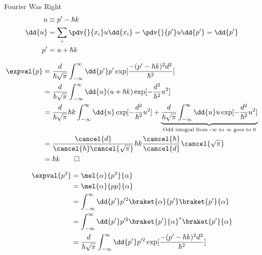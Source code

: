 \begin{answer}
\begin{answerpart}{Fourier Was Right}
    \begin{equation}
      \begin{split}
        u &\equiv p' - \hbar k\\
        \dd{u} &= \sum_i \pdv{}{x_i}u \dd{x_i} = \pdv{}{p'}u \dd{p'} = \dd{p'}\\
        p' &= u + \hbar k\\
      \end{split}
    \end{equation}

    \begin{equation}
      \begin{split}
        \expval{p}
        &=
        \frac{d}{\hbar\sqrt{\pi}}
        \int_{-\infty}^{\infty} \dd{p'} p'
        \exp[\frac{-(p' - \hbar k)^2d^2}{\hbar^2}]
        \\
        &=
        \frac{d}{\hbar\sqrt{\pi}}
        \int_{-\infty}^{\infty} \dd{u} (u + \hbar k)
        \exp[-\frac{d^2}{\hbar^2}u^2]
        \\
        &=
        \frac{d}{\hbar\sqrt{\pi}}
        \hbar k
        \int_{-\infty}^{\infty} \dd{u}
        \exp[-\frac{d^2}{\hbar^2}u^2]
        +
        \underbrace{
        \frac{d}{\hbar\sqrt{\pi}}
        \int_{-\infty}^{\infty} \dd{u} u
        \exp[-\frac{d^2}{\hbar^2}u^2]
        }_{\text{Odd integral from -$\infty$ to $\infty$ goes to 0}}
        \\
        &=
        \frac{\cancel{d}}{\cancel{\hbar}\cancel{\sqrt{\pi}}}
        \hbar k
        \frac{\cancel{\hbar}}{\cancel{d}}\cancel{\sqrt{\pi}}
        \\
        &=
        \hbar k\qed{}
        \\
      \end{split}
    \end{equation}

    \begin{equation}
      \begin{split}
        \expval{p^2}
        &= \mel{\alpha}{p^2}{\alpha}\\
        &= \mel{\alpha}{pp}{\alpha}\\
        &= \int_{-\infty}^{\infty} \dd{p'} p'^2 \braket{\alpha}{p'}\braket{p'}{\alpha}\\
        &= \int_{-\infty}^{\infty} \dd{p'} p'^2 \braket{p'}{\alpha}^{*}\braket{p'}{\alpha}
        \\
        &=
        \frac{d}{\hbar\sqrt{\pi}}
        \int_{-\infty}^{\infty} \dd{p'} p'^2
        \exp[\frac{-(p' - \hbar k)^2d^2}{\hbar^2}]
        \\
      \end{split}
    \end{equation}


\end{answerpart}
\end{answer}
